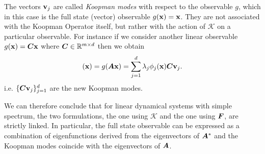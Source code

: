 The vectors $\vb{v}_j$ are called \emph{Koopman modes} with respect to the observable $g$, which in this case is the full state (vector) observable $g(\vb{x}) = \vb{x}$. They are not associated with the Koopman Operator itself, but rather with the action of $\mathcal{K}$ on a particular observable. For instance if we consider another linear observable $g(\vb{x}) = \vb*{C}\vb{x}$ where $\vb*{C}\in\mathbb{R}^{m \times d}$ then we obtain
\begin{equation*}
	[\mathcal{K}g](\vb{x}) = g(\vb*{A}\vb{x})  = \sum_{j=1}^d \lambda_j \phi_j(\vb{x}) \vb*{C}\vb{v}_j.
\end{equation*}
i.e. $\{\vb*{C}\vb{v}_j\}_{j = 1}^d$ are the new Koopman modes.

We can therefore conclude that for linear dynamical systems with simple spectrum, the two formulations, the one using $\mathcal{K}$ and the one using $\vb*{F}$, are strictly linked. In particular, the full state observable can be expressed as a combination of eigenfunctions derived from the eigenvectors of $\vb*{A}^*$ and the Koopman modes coincide with the eigenvectors of $\vb*{A}$. 

